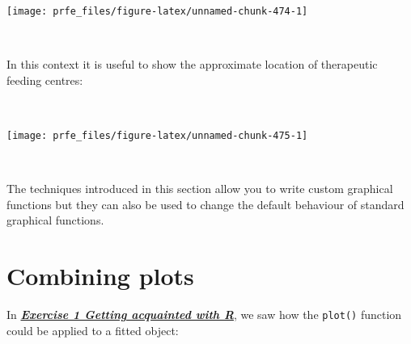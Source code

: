 \documentclass[12pt,a4paper]{book}
\newenvironment{Shaded}{\begin{snugshade}}{\end{snugshade}}
\newcommand{\KeywordTok}[1]{\textcolor[rgb]{0.13,0.29,0.53}{\textbf{#1}}}
\newcommand{\DataTypeTok}[1]{\textcolor[rgb]{0.13,0.29,0.53}{#1}}
\newcommand{\DecValTok}[1]{\textcolor[rgb]{0.00,0.00,0.81}{#1}}
\newcommand{\FloatTok}[1]{\textcolor[rgb]{0.00,0.00,0.81}{#1}}
\newcommand{\StringTok}[1]{\textcolor[rgb]{0.31,0.60,0.02}{#1}}
\newcommand{\OtherTok}[1]{\textcolor[rgb]{0.56,0.35,0.01}{#1}}
\newcommand{\OperatorTok}[1]{\textcolor[rgb]{0.81,0.36,0.00}{\textbf{#1}}}
\newcommand{\NormalTok}[1]{#1}
\theoremstyle{definition}
\theoremstyle{definition}
\theoremstyle{definition}
\theoremstyle{remark}
\begin{document}
\begin{center}\texttt{[image: prfe\_files/figure-latex/unnamed-chunk-474-1]} \end{center}

~

In this context it is useful to show the approximate location of
therapeutic feeding centres:

~

\begin{Shaded}
\end{Shaded}

\begin{center}\texttt{[image: prfe\_files/figure-latex/unnamed-chunk-475-1]} \end{center}

~

The techniques introduced in this section allow you to write custom
graphical functions but they can also be used to change the default
behaviour of standard graphical functions.

\hypertarget{combining-plots}{%
\section{Combining plots}\label{combining-plots}}

In \protect\hyperlink{exercise1}{\textbf{\emph{Exercise 1 Getting
acquainted with R}}}, we saw how the \texttt{plot()} function could be
applied to a fitted object:
\end{document}
